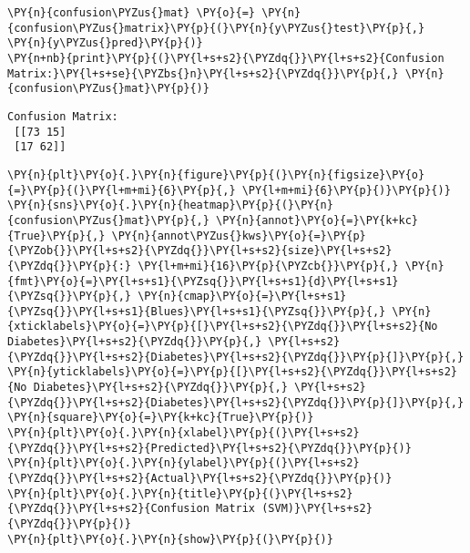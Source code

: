     \begin{tcolorbox}[breakable, size=fbox, boxrule=1pt, pad at break*=1mm,colback=cellbackground, colframe=cellborder]
\begin{Verbatim}[commandchars=\\\{\}]
\PY{n}{confusion\PYZus{}mat} \PY{o}{=} \PY{n}{confusion\PYZus{}matrix}\PY{p}{(}\PY{n}{y\PYZus{}test}\PY{p}{,} \PY{n}{y\PYZus{}pred}\PY{p}{)}
\PY{n+nb}{print}\PY{p}{(}\PY{l+s+s2}{\PYZdq{}}\PY{l+s+s2}{Confusion Matrix:}\PY{l+s+se}{\PYZbs{}n}\PY{l+s+s2}{\PYZdq{}}\PY{p}{,} \PY{n}{confusion\PYZus{}mat}\PY{p}{)}
\end{Verbatim}
\end{tcolorbox}

    \begin{Verbatim}[commandchars=\\\{\}]
Confusion Matrix:
 [[73 15]
 [17 62]]
    \end{Verbatim}

    \begin{tcolorbox}[breakable, size=fbox, boxrule=1pt, pad at break*=1mm,colback=cellbackground, colframe=cellborder]
\begin{Verbatim}[commandchars=\\\{\}]
\PY{n}{plt}\PY{o}{.}\PY{n}{figure}\PY{p}{(}\PY{n}{figsize}\PY{o}{=}\PY{p}{(}\PY{l+m+mi}{6}\PY{p}{,} \PY{l+m+mi}{6}\PY{p}{)}\PY{p}{)}
\PY{n}{sns}\PY{o}{.}\PY{n}{heatmap}\PY{p}{(}\PY{n}{confusion\PYZus{}mat}\PY{p}{,} \PY{n}{annot}\PY{o}{=}\PY{k+kc}{True}\PY{p}{,} \PY{n}{annot\PYZus{}kws}\PY{o}{=}\PY{p}{\PYZob{}}\PY{l+s+s2}{\PYZdq{}}\PY{l+s+s2}{size}\PY{l+s+s2}{\PYZdq{}}\PY{p}{:} \PY{l+m+mi}{16}\PY{p}{\PYZcb{}}\PY{p}{,} \PY{n}{fmt}\PY{o}{=}\PY{l+s+s1}{\PYZsq{}}\PY{l+s+s1}{d}\PY{l+s+s1}{\PYZsq{}}\PY{p}{,} \PY{n}{cmap}\PY{o}{=}\PY{l+s+s1}{\PYZsq{}}\PY{l+s+s1}{Blues}\PY{l+s+s1}{\PYZsq{}}\PY{p}{,} \PY{n}{xticklabels}\PY{o}{=}\PY{p}{[}\PY{l+s+s2}{\PYZdq{}}\PY{l+s+s2}{No Diabetes}\PY{l+s+s2}{\PYZdq{}}\PY{p}{,} \PY{l+s+s2}{\PYZdq{}}\PY{l+s+s2}{Diabetes}\PY{l+s+s2}{\PYZdq{}}\PY{p}{]}\PY{p}{,} \PY{n}{yticklabels}\PY{o}{=}\PY{p}{[}\PY{l+s+s2}{\PYZdq{}}\PY{l+s+s2}{No Diabetes}\PY{l+s+s2}{\PYZdq{}}\PY{p}{,} \PY{l+s+s2}{\PYZdq{}}\PY{l+s+s2}{Diabetes}\PY{l+s+s2}{\PYZdq{}}\PY{p}{]}\PY{p}{,} \PY{n}{square}\PY{o}{=}\PY{k+kc}{True}\PY{p}{)}
\PY{n}{plt}\PY{o}{.}\PY{n}{xlabel}\PY{p}{(}\PY{l+s+s2}{\PYZdq{}}\PY{l+s+s2}{Predicted}\PY{l+s+s2}{\PYZdq{}}\PY{p}{)}
\PY{n}{plt}\PY{o}{.}\PY{n}{ylabel}\PY{p}{(}\PY{l+s+s2}{\PYZdq{}}\PY{l+s+s2}{Actual}\PY{l+s+s2}{\PYZdq{}}\PY{p}{)}
\PY{n}{plt}\PY{o}{.}\PY{n}{title}\PY{p}{(}\PY{l+s+s2}{\PYZdq{}}\PY{l+s+s2}{Confusion Matrix (SVM)}\PY{l+s+s2}{\PYZdq{}}\PY{p}{)}
\PY{n}{plt}\PY{o}{.}\PY{n}{show}\PY{p}{(}\PY{p}{)}
\end{Verbatim}
\end{tcolorbox}

